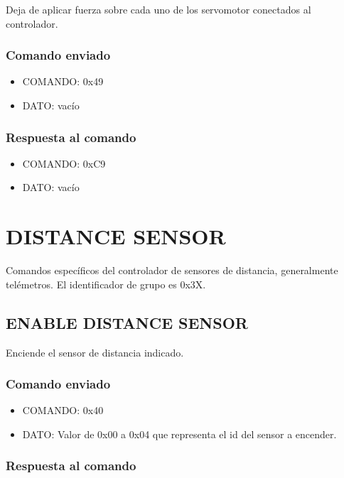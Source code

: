 \documentclass[a4paper,10pt]{article}
\begin{document}
Deja de aplicar fuerza sobre cada uno de los servomotor conectados al controlador.

\subsubsection*{Comando enviado}

\begin{itemize}
	\item{COMANDO:} 0x49
	\item{DATO:} vac\'io
\end{itemize}

\subsubsection*{Respuesta al comando}

\begin{itemize}
	\item{COMANDO:} 0xC9
	\item{DATO:} vac\'io
\end{itemize}

\section{DISTANCE SENSOR}
\label{grupo_distance_sensor}

Comandos espec\'ificos del controlador de sensores de distancia, generalmente tel\'emetros.
El identificador de grupo es 0x3X.

\subsection{ENABLE DISTANCE SENSOR}
\label{enable_distance_sensor}

Enciende el sensor de distancia indicado.

\subsubsection*{Comando enviado}

\begin{itemize}
	\item{COMANDO:} 0x40
	\item{DATO:} Valor de 0x00 a 0x04 que representa el id del sensor a encender.
\end{itemize}

\subsubsection*{Respuesta al comando}
\end{document}
